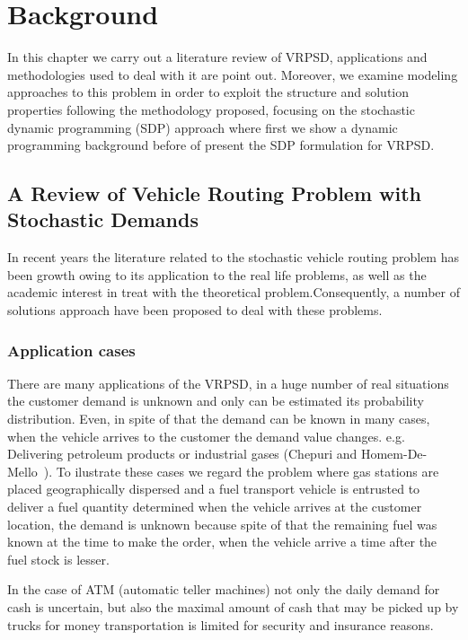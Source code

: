 \chapter{Background}
\label{chap:backgroud}

In this chapter we carry out a literature review of VRPSD, applications and methodologies used to deal with it are point out.
Moreover, we examine modeling approaches to this problem in order to exploit the structure and solution properties following the methodology proposed, focusing on the stochastic dynamic programming (SDP) approach where first we show a dynamic programming background before of present the SDP formulation for VRPSD.


\section{A Review of Vehicle Routing Problem with Stochastic Demands}

In recent years the literature related to the stochastic vehicle routing problem has been growth owing to its application to the real life problems, as well as the academic interest in treat with the theoretical problem.Consequently, a number of solutions approach have been proposed to deal with these problems.

\subsection{Application cases}

There are many applications of the VRPSD, in a huge number of real situations the customer demand is unknown and only can be estimated its probability distribution. Even, in spite of that the demand can be known in many cases, when the vehicle arrives to the customer the demand value changes. e.g. Delivering petroleum products or industrial gases (Chepuri and Homem-De-Mello~\cite{Chepuri}). To ilustrate these cases we regard the problem where gas stations are placed geographically dispersed and a fuel transport vehicle is entrusted to deliver a fuel quantity determined when the vehicle arrives at the customer location, the demand is unknown because spite of that the remaining fuel was known at the time to make the order, when the vehicle arrive a time after the fuel stock is lesser.

In the case of ATM (automatic teller machines) not only the daily demand for cash is uncertain, but also the maximal amount of cash that may be picked up by trucks for money transportation is limited for security and insurance reasons.

